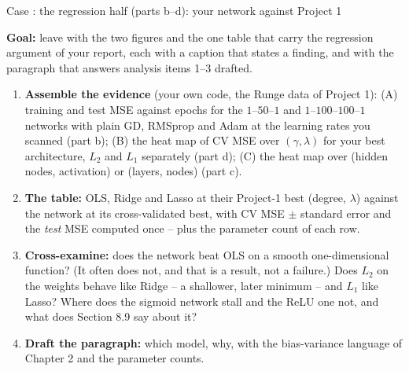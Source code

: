 \documentclass[10pt,aspectratio=169]{beamer}
\newcounter{case}
\newenvironment{case}[1][]{%
  \stepcounter{case}%
  \begin{frame}[fragile,environment=case]{Case \arabic{case}: #1}%
}{\end{frame}}
\begin{document}

\begin{case}[the regression half (parts b--d): your network against Project 1]
\footnotesize
\textbf{Goal:} leave with the two figures and the one table that carry the
regression argument of your report, each with a caption that states a
finding, and with the paragraph that answers analysis items 1--3 drafted.
\begin{enumerate}
  \item \textbf{Assemble the evidence} (your own code, the Runge data of
        Project 1): (A) training and test MSE against epochs for the
        $1$--$50$--$1$ and $1$--$100$--$100$--$1$ networks with plain GD,
        RMSprop and Adam at the learning rates you scanned (part b); (B) the
        heat map of CV MSE over $(\gamma,\lambda)$ for your best
        architecture, $L_2$ and $L_1$ separately (part d); (C) the heat map
        over (hidden nodes, activation) or (layers, nodes) (part c).
  \item \textbf{The table:} OLS, Ridge and Lasso at their Project-1 best
        (degree, $\lambda$) against the network at its cross-validated best,
        with CV MSE $\pm$ standard error and the \emph{test} MSE computed
        once -- plus the parameter count of each row.
  \item \textbf{Cross-examine:} does the network beat OLS on a smooth
        one-dimensional function?  (It often does not, and that is a result,
        not a failure.)  Does $L_2$ on the weights behave like Ridge -- a
        shallower, later minimum -- and $L_1$ like Lasso?  Where does the
        sigmoid network stall and the ReLU one not, and what does Section
        8.9 say about it?
  \item \textbf{Draft the paragraph:} which model, why, with the
        bias-variance language of Chapter 2 and the parameter counts.
\end{enumerate}
\end{case}
\end{document}
